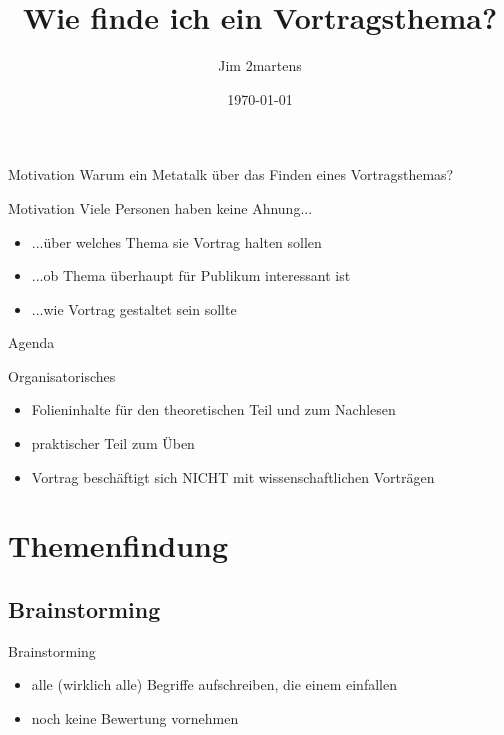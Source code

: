 \documentclass{beamer}
\begin{document}
\author{Jim 2martens}
\title{Wie finde ich ein Vortragsthema?}
\date{\today}

\begin{frame}
    \titlepage
\end{frame}

\begin{frame}{Motivation}
    \centering
    Warum ein Metatalk über das Finden eines Vortragsthemas?
\end{frame}

\begin{frame}{Motivation}
    Viele Personen haben keine Ahnung...
    \begin{itemize}
        \item ...über welches Thema sie Vortrag halten sollen
        \item ...ob Thema überhaupt für Publikum interessant ist
        \item ...wie Vortrag gestaltet sein sollte
    \end{itemize}
\end{frame}

\begin{frame}{Agenda} 
    \tableofcontents
\end{frame}

\begin{frame}{Organisatorisches}
    \begin{itemize}
        \item Folieninhalte für den theoretischen Teil und zum Nachlesen
        \item praktischer Teil zum Üben
        \item Vortrag beschäftigt sich NICHT mit wissenschaftlichen Vorträgen
    \end{itemize}
\end{frame}

\section{Themenfindung}
    \subsection{Brainstorming}

    \begin{frame}{Brainstorming} 
        \begin{itemize}
            \item alle (wirklich alle) Begriffe aufschreiben, die einem einfallen
            \item noch keine Bewertung vornehmen
        \end{itemize}
    \end{frame}
\end{document}
